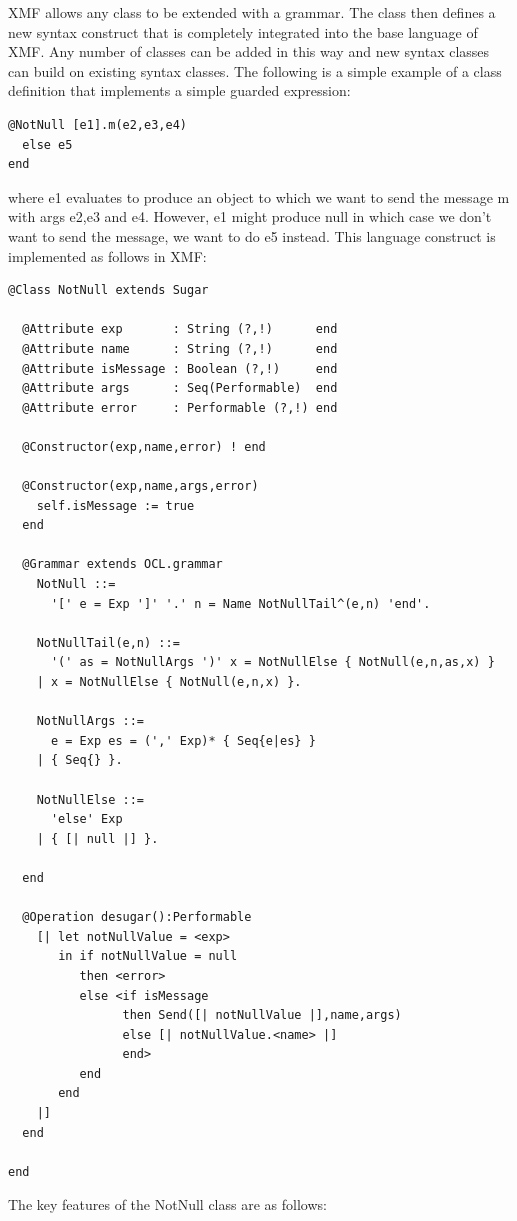 XMF allows any class to be extended with a grammar. The class then
defines a new syntax construct that is completely integrated into
the base language of XMF. Any number of classes can be added in this
way and new syntax classes can build on existing syntax classes. The
following is a simple example of a class definition that implements
a simple guarded expression:

\begin{lstlisting}
@NotNull [e1].m(e2,e3,e4)
  else e5
end
\end{lstlisting}where e1 evaluates to produce an object to which we want to send the
message m with args e2,e3 and e4. However, e1 might produce null in
which case we don't want to send the message, we want to do e5 instead.
This language construct is implemented as follows in XMF:

\begin{lstlisting}
@Class NotNull extends Sugar

  @Attribute exp       : String (?,!)      end
  @Attribute name      : String (?,!)      end
  @Attribute isMessage : Boolean (?,!)     end
  @Attribute args      : Seq(Performable)  end
  @Attribute error     : Performable (?,!) end
    
  @Constructor(exp,name,error) ! end
    
  @Constructor(exp,name,args,error) 
    self.isMessage := true
  end
    
  @Grammar extends OCL.grammar
    NotNull ::= 
      '[' e = Exp ']' '.' n = Name NotNullTail^(e,n) 'end'.
      
    NotNullTail(e,n) ::= 
      '(' as = NotNullArgs ')' x = NotNullElse { NotNull(e,n,as,x) }
    | x = NotNullElse { NotNull(e,n,x) }.
      
    NotNullArgs ::=
      e = Exp es = (',' Exp)* { Seq{e|es} }
    | { Seq{} }.
      
    NotNullElse ::=
      'else' Exp 
    | { [| null |] }.
      
  end
    
  @Operation desugar():Performable
    [| let notNullValue = <exp>
       in if notNullValue = null
          then <error>
          else <if isMessage
                then Send([| notNullValue |],name,args)
                else [| notNullValue.<name> |]
                end>
          end
       end
    |]
  end
    
end
\end{lstlisting}The key features of the NotNull class are as follows:

